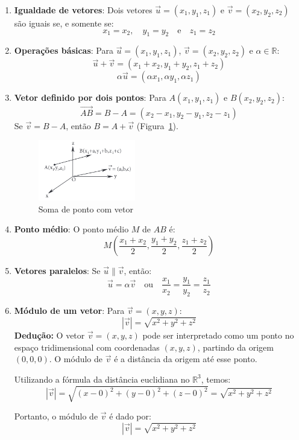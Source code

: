 \begin{enumerate}
  \item \textbf{Igualdade de vetores}: Dois vetores $\vec{u} = (x_1, y_1, z_1)$
    e $\vec{v} = (x_2, y_2, z_2)$ são iguais se, e somente se:
    \[
      x_1 = x_2, \quad y_1 = y_2 \quad \text{e} \quad z_1 = z_2
    \]

  \item \textbf{Operações básicas}: Para $\vec{u} = (x_1, y_1, z_1)$, $\vec{v} =
    (x_2, y_2, z_2)$ e $\alpha \in \mathbb{R}$:
    \[
      \vec{u} + \vec{v} = (x_1 + x_2, y_1 + y_2, z_1 + z_2)
    \]
    \[
      \alpha\vec{u} = (\alpha x_1, \alpha y_1, \alpha z_1)
    \]

  \item \textbf{Vetor definido por dois pontos}: Para $A(x_1,y_1,z_1)$ e
    $B(x_2,y_2,z_2)$:
    \[
      \overrightarrow{AB} = B - A = (x_2 - x_1, y_2 - y_1, z_2 - z_1)
    \]
    Se $\vec{v} = B - A$, então $B = A + \vec{v}$ (Figura~\ref{fig:fig1.61}).

    \begin{figure}[h]
      \centering
      \includegraphics[width=0.4\textwidth]{./fig/fig1.61.png}
      \caption{Soma de ponto com vetor}\label{fig:fig1.61}
    \end{figure}

  \item \textbf{Ponto médio}: O ponto médio $M$ de $AB$ é:
    \[
      M\left(\frac{x_1+x_2}{2}, \frac{y_1+y_2}{2}, \frac{z_1+z_2}{2}\right)
    \]

  \item \textbf{Vetores paralelos}: Se $\vec{u} \parallel \vec{v}$, então:
    \[
      \vec{u} = \alpha\vec{v} \quad \text{ou} \quad \frac{x_1}{x_2} =
      \frac{y_1}{y_2} = \frac{z_1}{z_2}
    \]

  \item \textbf{Módulo de um vetor}: Para $\vec{v} = (x,y,z)$:
    \[
      |\vec{v}| = \sqrt{x^2 + y^2 + z^2}
    \]
    \textbf{Dedução:} O vetor $\vec{v} = (x, y, z)$ pode ser interpretado como
    um ponto no espaço tridimensional com coordenadas $(x, y, z)$, partindo da
    origem $(0,0,0)$. O módulo de $\vec{v}$ é a distância da origem até esse
    ponto.

    Utilizando a fórmula da distância euclidiana no $\mathbb{R}^3$, temos:
    \[
      |\vec{v}| = \sqrt{(x - 0)^2 + (y - 0)^2 + (z - 0)^2} = \sqrt{x^2 + y^2 +
      z^2}
    \]

    Portanto, o módulo de $\vec{v}$ é dado por:
    \[
      |\vec{v}| = \sqrt{x^2 + y^2 + z^2}
    \]
\end{enumerate}
